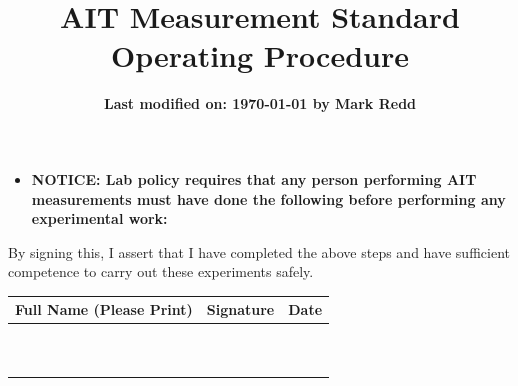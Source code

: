 \documentclass[letterpaper,11pt]{article}
\title{\textbf{AIT Measurement Standard Operating Procedure}}
\date{\textbf{Last modified on: \today \hspace{1mm} by Mark Redd}}
\begin{document}
\maketitle

\begin{itemize}
\item \textbf{NOTICE: Lab policy requires that any person performing 
    AIT measurements must have done the following before performing any 
    experimental work:}
    
\end{itemize}

By signing this, I assert that I have completed the above steps and have 
sufficient competence to carry out these experiments safely. 
\begin{center}
\begin{tabu} to 0.9\textwidth {X[c]|X[c]|X[c]}
 Full Name (Please Print) & Signature & Date  \\ 
 \hline
 \vspace{5mm} & & \\ \hline 
 \vspace{5mm} & & \\ \hline 
 \vspace{5mm} & & \\ \hline 
 \vspace{5mm} & & \\ \hline 
 \vspace{5mm} & & \\ \hline 
 \vspace{5mm} & & \\ \hline 
 \vspace{5mm} & & \\ \hline 
 \vspace{5mm} & & \\ \hline 
 \vspace{5mm} & & \\ \hline 
 \vspace{5mm} & & \\ \hline 

 
\end{tabu}
\end{center}
\end{document}

